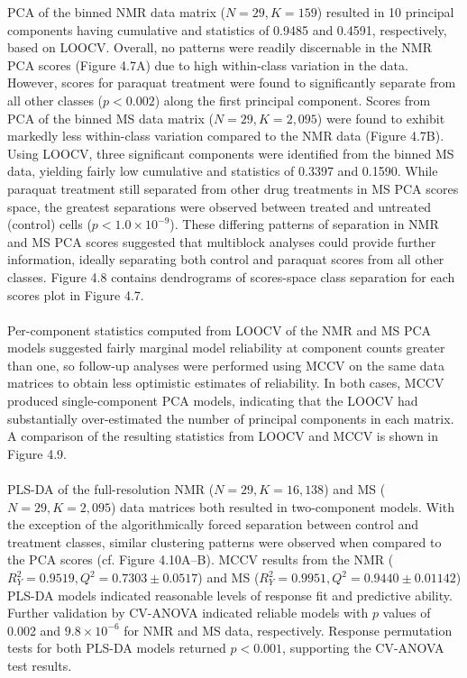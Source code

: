 \begin{doublespace}
PCA of the binned NMR data matrix ($N = 29, K = 159$) resulted in 10 principal
components having cumulative \rsqx{} and \qsq{} statistics of 0.9485 and
0.4591, respectively, based on LOOCV. Overall, no patterns were readily
discernable in the NMR PCA scores (Figure 4.7A) due to high within-class
variation in the data. However, scores for paraquat treatment were found
to significantly separate from all other classes ($p < 0.002$) along the
first principal component. Scores from PCA of the binned MS data matrix
($N = 29, K = 2,095$) were found to exhibit markedly less within-class
variation compared to the NMR data (Figure 4.7B). Using LOOCV, three
significant components were identified from the binned MS data, yielding
fairly low cumulative \rsqx{} and \qsq{} statistics of 0.3397 and 0.1590.
While paraquat treatment still separated from other drug treatments in MS
PCA scores space, the greatest separations were observed between treated
and untreated (control) cells ($p < 1.0 \times 10^{-9}$). These differing
patterns of separation in NMR and MS PCA scores suggested that multiblock
analyses could provide further information, ideally separating both control
and paraquat scores from all other classes. Figure 4.8 contains dendrograms
of scores-space class separation for each scores plot in Figure 4.7.
\\\\
Per-component \qsq{} statistics computed from LOOCV of the NMR and MS PCA
models suggested fairly marginal model reliability at component counts greater
than one, so follow-up analyses were performed using MCCV on the same data
matrices to obtain less optimistic estimates of reliability. In both cases,
MCCV produced single-component PCA models, indicating that the LOOCV had
substantially over-estimated the number of principal components in each
matrix. A comparison of the resulting \qsq{} statistics from LOOCV and MCCV
is shown in Figure 4.9.
\\\\
PLS-DA of the full-resolution NMR ($N = 29, K = 16,138$) and
MS ($N = 29, K = 2,095$) data matrices both resulted in two-component models.
With the exception of the algorithmically forced separation between control
and treatment classes, similar clustering patterns were observed when compared
to the PCA scores (cf. Figure 4.10A--B). MCCV results from the
NMR ($R^2_Y = 0.9519, Q^2 = 0.7303 \pm 0.0517$) and
MS ($R^2_Y = 0.9951, Q^2 = 0.9440 \pm 0.01142$) PLS-DA models indicated
reasonable levels of response fit and predictive ability. Further validation
by CV-ANOVA \cite{eriksson:jchemo2008} indicated reliable models with $p$
values of 0.002 and $9.8 \times 10^{-6}$ for NMR and MS data, respectively.
Response permutation tests for both PLS-DA models returned $p < 0.001$,
supporting the CV-ANOVA test results.
\end{doublespace}

